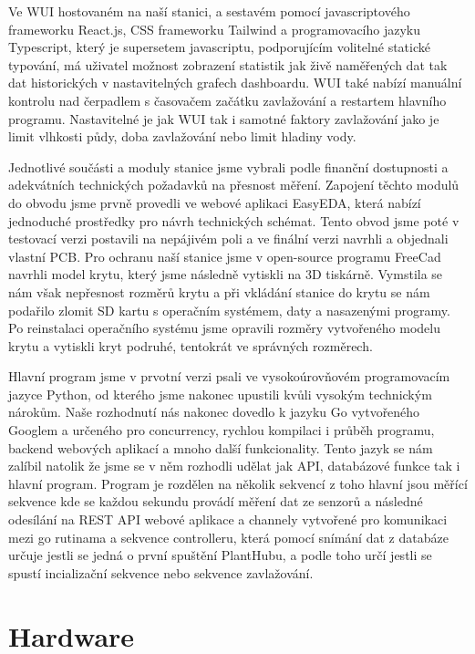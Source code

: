 \documentclass[12pt,a4paper]{article}
\begin{document}
Ve WUI hostovaném na naší stanici, a sestavém pomocí javascriptového frameworku
React.js, CSS frameworku
Tailwind a programovacího jazyku Typescript, který je supersetem javascriptu,
podporujícím volitelné statické typování, má uživatel
možnost zobrazení statistik jak živě naměřených dat tak dat historických v
nastavitelných grafech dashboardu. WUI také nabízí manuální kontrolu nad
čerpadlem s časovačem začátku zavlažování a restartem hlavního programu.
Nastavitelné je jak WUI tak i samotné faktory zavlažování jako je limit
vlhkosti
půdy, doba zavlažování nebo limit hladiny vody.

Jednotlivé součásti a moduly stanice jsme vybrali podle finanční dostupnosti a
adekvátních technických
požadavků na přesnost měření.
Zapojení těchto modulů do obvodu jsme prvně provedli ve webové aplikaci
EasyEDA, která nabízí jednoduché prostředky pro návrh technických
schémat. Tento obvod jsme poté v testovací verzi postavili na nepájivém
poli a ve finální verzi navrhli a objednali vlastní PCB. Pro ochranu naší
stanice jsme v open-source programu FreeCad navrhli model krytu, který jsme
následně vytiskli na 3D tiskárně. Vymstila se nám však nepřesnost rozměrů krytu
a při vkládání stanice do krytu se nám podařilo zlomit SD kartu s operačním
systémem, daty a nasazenými programy. Po reinstalaci operačního systému jsme
opravili rozměry vytvořeného modelu krytu a
vytiskli kryt podruhé, tentokrát ve správných rozměrech.

Hlavní program jsme v prvotní verzi psali ve vysokoúrovňovém programovacím
jazyce Python, od kterého jsme nakonec upustili kvůli vysokým technickým
nárokům. Naše rozhodnutí nás nakonec dovedlo k jazyku
Go vytvořeného Googlem a určeného pro concurrency, rychlou kompilaci i průběh
programu, backend webových aplikací a mnoho
další funkcionality. Tento jazyk se nám zalíbil natolik že jsme se v něm
rozhodli
udělat jak API,
databázové funkce tak i hlavní program. Program je rozdělen na několik sekvencí
z toho hlavní jsou měřící sekvence kde se každou sekundu provádí měření dat ze
senzorů a následné odesílání na REST API webové aplikace a channely vytvořené
pro komunikaci mezi go rutinama a sekvence controlleru, která pomocí snímání
dat z databáze určuje jestli se jedná o první spuštění PlantHubu, a podle toho
určí jestli se spustí incializační sekvence nebo sekvence zavlažování.

\section{Hardware}
\end{document}
